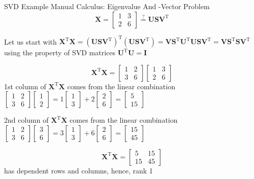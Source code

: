 \documentclass[mathserif, aspectratio=1610]{intbeamer}
\begin{document}
\begin{frame}[t]{SVD Example Manual Calculus: Eigenvalue And -Vector Problem}
$$\bm{X} =
\begin{bmatrix}
1 & 3\\
2 & 6
\end{bmatrix}
\stackrel{?}{=}
\bm{U}\bm{S}\bm{V}^\mathrm{T}
$$

Let us start with
$\bm{X}^\mathrm{T} \bm{X} = (\bm{U}\bm{S}\bm{V}^\mathrm{T})^\mathrm{T} (\bm{U}\bm{S}\bm{V}^\mathrm{T})
= \bm{V}\bm{S}^\mathrm{T}\bm{U}^\mathrm{T} \bm{U}\bm{S}\bm{V}^\mathrm{T}
= \bm{V}\bm{S}^\mathrm{T}\bm{S}\bm{V}^\mathrm{T}
$
using the property of SVD matrices $\bm{U}^\mathrm{T} \bm{U} = \bm{I}$

$$\bm{X}^\mathrm{T} \bm{X} =
\begin{bmatrix}
1 & 2\\
3 & 6
\end{bmatrix}
\begin{bmatrix}
1 & 3\\
2 & 6
\end{bmatrix}
$$
1st column of $\bm{X}^\mathrm{T} \bm{X}$
comes from the linear combination
$\begin{bmatrix}
1 & 2\\
3 & 6
\end{bmatrix}
\begin{bmatrix}
1 \\ 2
\end{bmatrix}
=
1
\begin{bmatrix}
1\\
3
\end{bmatrix}
+2
\begin{bmatrix}
2\\
6
\end{bmatrix}
=
\begin{bmatrix}
5\\
15
\end{bmatrix}
$

2nd column of $\bm{X}^\mathrm{T} \bm{X}$
comes from the linear combination
$\begin{bmatrix}
1 & 2\\
3 & 6
\end{bmatrix}
\begin{bmatrix}
3 \\ 6
\end{bmatrix}
=
3
\begin{bmatrix}
1\\
3
\end{bmatrix}
+6
\begin{bmatrix}
2\\
6
\end{bmatrix}
=
\begin{bmatrix}
15\\
45
\end{bmatrix}
$

$$\bm{X}^\mathrm{T} \bm{X} = \begin{bmatrix}
5 & 15\\
15 & 45
\end{bmatrix}$$
has dependent rows and columns, hence, rank 1

\end{frame}
\end{document}
